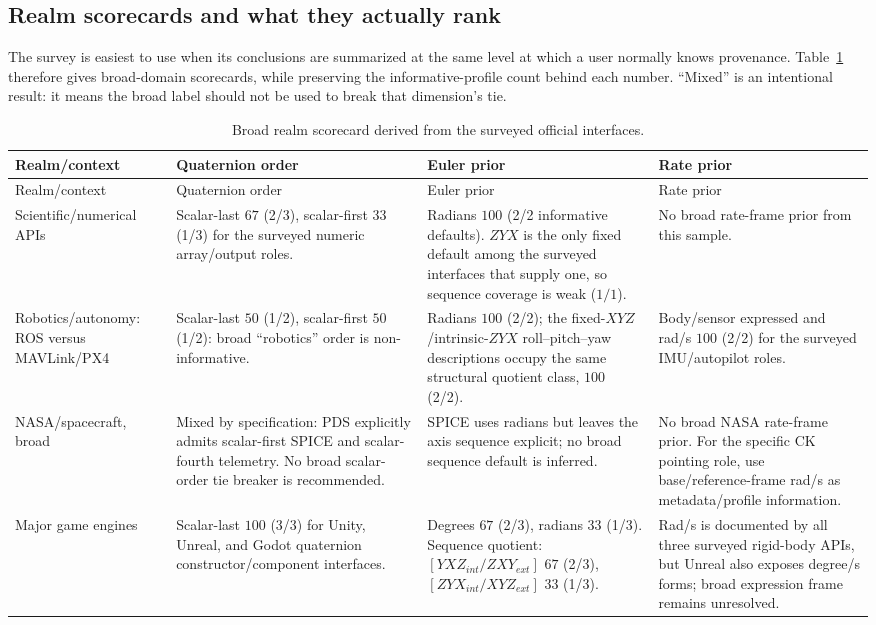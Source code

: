 \documentclass[11pt]{article}
\begin{document}
    \subsection{Realm scorecards and what they actually rank}\label{sec:realm-scorecards}

    The survey is easiest to use when its conclusions are summarized at the same level at
    which a user normally knows provenance. Table~\ref{tab:realm-scorecard} therefore gives
    broad-domain scorecards, while preserving the informative-profile count behind each
    number. ``Mixed'' is an intentional result: it means the broad label should not be used
    to break that dimension's tie.

    \begingroup
    \small
    \setlength{\tabcolsep}{3.4pt}
    \begin{longtable}{@{}p{}p{}p{}p{}@{}}
        \caption{Broad realm scorecard derived from the surveyed official interfaces.}
        \label{tab:realm-scorecard}\\
        \toprule
        Realm/context & Quaternion order & Euler prior & Rate prior \\
        \midrule
        \endfirsthead
        \toprule
        Realm/context & Quaternion order & Euler prior & Rate prior \\
        \midrule
        \endhead
        \bottomrule
        \endlastfoot
        Scientific/numerical APIs
        & Scalar-last $67$ (2/3), scalar-first $33$ (1/3) for the surveyed numeric array/output roles.
        & Radians $100$ (2/2 informative defaults).  $ZYX$ is the only fixed default among the surveyed interfaces that supply one, so sequence coverage is weak ($1/1$).
        & No broad rate-frame prior from this sample. \\
        Robotics/autonomy: ROS versus MAVLink/PX4
        & Scalar-last $50$ (1/2), scalar-first $50$ (1/2): broad ``robotics'' order is non-informative.
        & Radians $100$ (2/2); the fixed-$XYZ$/intrinsic-$ZYX$ roll--pitch--yaw descriptions occupy the same structural quotient class, $100$ (2/2).
        & Body/sensor expressed and rad/s $100$ (2/2) for the surveyed IMU/autopilot roles. \\
        NASA/spacecraft, broad
        & Mixed by specification: PDS explicitly admits scalar-first SPICE and scalar-fourth telemetry. No broad scalar-order tie breaker is recommended.
        & SPICE uses radians but leaves the axis sequence explicit; no broad sequence default is inferred.
        & No broad NASA rate-frame prior. For the specific CK pointing role, use base/reference-frame rad/s as metadata/profile information. \\
        Major game engines
        & Scalar-last $100$ (3/3) for Unity, Unreal, and Godot quaternion constructor/component interfaces.
        & Degrees $67$ (2/3), radians $33$ (1/3). Sequence quotient: $[YXZ_{int}/ZXY_{ext}]$ $67$ (2/3), $[ZYX_{int}/XYZ_{ext}]$ $33$ (1/3).
        & Rad/s is documented by all three surveyed rigid-body APIs, but Unreal also exposes degree/s forms; broad expression frame remains unresolved. \\
    \end{longtable}
    \endgroup
\end{document}
